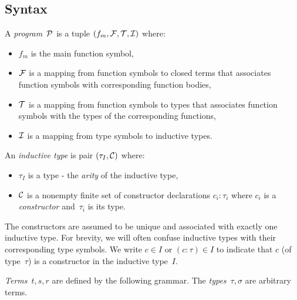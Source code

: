 \documentclass[
    9pt,            %
    techreport,        %
    affiltop,       %
]{art}
\begin{document}
\subsection{Syntax}\label{sec_syntax}

A \JuvixCore{} \emph{program}~$\mathcal{P}$ is a tuple $(f_m,\mathcal{F},\mathcal{T},\mathcal{I})$ where:
\begin{itemize}
\item $f_m$ is the main function symbol,
\item $\mathcal{F}$ is a mapping from function symbols to closed terms that
associates function symbols with corresponding function bodies,
\item $\mathcal{T}$ is a mapping from function symbols to types that associates
function symbols with the types of the corresponding functions,
\item $\mathcal{I}$ is a mapping from type symbols to inductive types.
\end{itemize}
An \emph{inductive type} is pair $(\tau_I,\mathcal{C})$ where:
\begin{itemize}
\item $\tau_I$ is a type - the \emph{arity} of the inductive type,
\item $\mathcal{C}$ is a nonempty finite set of constructor declarations $c_i :
\tau_i$ where $c_i$ is a \emph{constructor} and~$\tau_i$ is its type.
\end{itemize}
The constructors are assumed to be unique and associated with exactly one
inductive type. For brevity, we will often confuse inductive types with
their corresponding type symbols. We write $c \in I$ or $(c : \tau) \in I$
to indicate that $c$ (of type~$\tau$) is a constructor in the inductive
type~$I$.

\emph{Terms}~$t,s,r$ are defined by the following grammar. The
\emph{types}~$\tau,\sigma$ are arbitrary terms.
\end{document}
